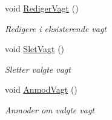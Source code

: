 \begin{DoxyCompactItemize}
void \hyperlink{class__1aarsproeve_1_1_handler_1_1_vagt_handler_a12d58edb6cb14b8d9071e64c5ec2eee9}{Rediger\+Vagt} ()
\begin{DoxyCompactList}\small\item\em Redigere i eksisterende vagt \end{DoxyCompactList}\item 
void \hyperlink{class__1aarsproeve_1_1_handler_1_1_vagt_handler_ab34331d398f924fd038d4345b7e84fa2}{Slet\+Vagt} ()
\begin{DoxyCompactList}\small\item\em Sletter valgte vagt \end{DoxyCompactList}\item 
void \hyperlink{class__1aarsproeve_1_1_handler_1_1_vagt_handler_a8eed6832306e23516e36eec668b4632b}{Anmod\+Vagt} ()
\begin{DoxyCompactList}\small\item\em Anmoder om valgte vagt \end{DoxyCompactList}\end{DoxyCompactItemize}
